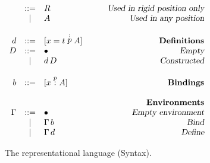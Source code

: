 \begin{figure}
\begin{center}
\begin{math}
\begin{array}{rclr}
&::=&
R
& \qquad\textsl{Used in rigid position only}
\\

&|&
A
& \qquad\textsl{Used in any position}
\\
\\
d 
&::=& 
[x = t \stackrel{:}{p} A] 
& \qquad\textsl{\bf Definitions}
\\
D
&::=&
\bullet
& \qquad\textsl{Empty}
\\
& | &
d\,D
& \qquad\textsl{Constructed}
\\
\\
b
&::=& [x \stackrel{p}{:} A]
& \qquad\textsl{\bf Bindings}
\\
\\
&&&\qquad\textsl{\bf Environments}\\
\Gamma 

&::=&
\bullet
& \qquad\textsl{Empty environment}
\\

&|&
\Gamma \, b
& \qquad\textsl{Bind}
\\
&|&
\Gamma \, d
& \qquad\textsl{Define}
\\

\end{array}
\end{math}
\end{center}

\caption{The {\system} representational language (Syntax).}
\label{fig:syntax-s2}
\end{figure}
